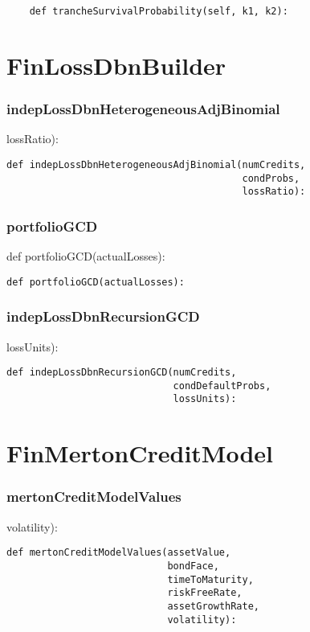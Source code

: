 \documentclass[twoside,11pt]{book}
\begin{document}
\begin{lstlisting}
    def trancheSurvivalProbability(self, k1, k2):
\end{lstlisting}

\newpage
\section{FinLossDbnBuilder}

\subsubsection*{{\bf indepLossDbnHeterogeneousAdjBinomial}}
lossRatio): 

\begin{lstlisting}
def indepLossDbnHeterogeneousAdjBinomial(numCredits,
                                         condProbs,
                                         lossRatio):
\end{lstlisting}

\subsubsection*{{\bf portfolioGCD}}
def portfolioGCD(actualLosses): 

\begin{lstlisting}
def portfolioGCD(actualLosses):
\end{lstlisting}

\subsubsection*{{\bf indepLossDbnRecursionGCD}}
lossUnits): 

\begin{lstlisting}
def indepLossDbnRecursionGCD(numCredits,
                             condDefaultProbs,
                             lossUnits):
\end{lstlisting}

\newpage
\section{FinMertonCreditModel}

\subsubsection*{{\bf mertonCreditModelValues}}
volatility): 

\begin{lstlisting}
def mertonCreditModelValues(assetValue,
                            bondFace,
                            timeToMaturity,
                            riskFreeRate,
                            assetGrowthRate,
                            volatility):
\end{lstlisting}
\end{document}

